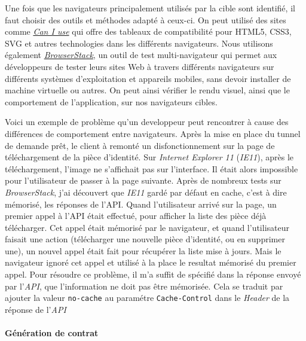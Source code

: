 \documentclass[12pt,a4paper]{article}
\begin{document}
  Une fois que les navigateurs principalement utilisés par la cible sont
  identifié, il faut choisir des outils et méthodes adapté à ceux-ci. On
  peut utilisé des sites comme \href{http://caniuse.com/}{\emph{Can I
  use}} qui offre des tableaux de compatibilité pour HTML5, CSS3, SVG et
  autres technologies dans les différents navigateurs. Nous utilisons
  également \href{https://www.browserstack.com/}{\emph{BrowserStack}}, un
  outil de test multi-navigateur qui permet aux développeurs de tester
  leurs sites Web à travers différents navigateurs sur différents systèmes
  d'exploitation et appareils mobiles, sans devoir installer de machine
  virtuelle ou autres. On peut ainsi vérifier le rendu visuel, ainsi que
  le comportement de l'application, sur nos navigateurs cibles.

  \bigskip

  Voici un exemple de problème qu'un developpeur peut rencontrer à cause
  des différences de comportement entre navigateurs. Après la mise en
  place du tunnel de demande prêt, le client à remonté un
  disfonctionnement sur la page de téléchargement de la pièce d'identité.
  Sur \emph{Internet Explorer 11} (\emph{IE11}), après le téléchargement,
  l'image ne s'affichait pas sur l'interface. Il était alors impossible
  pour l'utilisateur de passer à la page suivante. Après de nombreux tests
  sur \emph{BrowserStack}, j'ai découvert que \emph{IE11} gardé par défaut
  en cache, c'est à dire mémorisé, les réponses de l'API. Quand
  l'utilisateur arrivé sur la page, un premier appel à l'API était
  effectué, pour afficher la liste des pièce déjà télécharger. Cet appel
  était mémorisé par le navigateur, et quand l'utilisateur faisait une
  action (télécharger une nouvelle pièce d'identité, ou en supprimer une),
  un nouvel appel était fait pour récupérer la liste mise à jours. Mais le
  navigateur ignoré cet appel et utilisé à la place le resultat mémorisé
  du premier appel. Pour résoudre ce problème, il m'a suffit de spécifié
  dans la réponse envoyé par l'\emph{API}, que l'information ne doit pas
  être mémorisée. Cela se traduit par ajouter la valeur \texttt{no-cache}
  au paramétre \texttt{Cache-Control} dans le \emph{Header} de la réponse
  de l'\emph{API}

  \bigskip

  \paragraph{Génération de contrat}\label{guxe9nuxe9ration-de-contrat}
\end{document}

